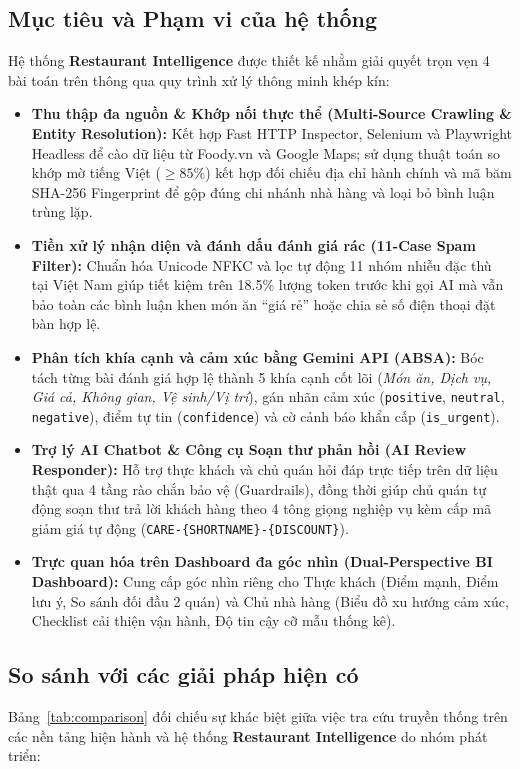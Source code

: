 \documentclass[12pt, a4paper]{article}
\begin{document}
\subsection{Mục tiêu và Phạm vi của hệ thống}
Hệ thống \textbf{Restaurant Intelligence} được thiết kế nhằm giải quyết trọn vẹn 4 bài toán trên thông qua quy trình xử lý thông minh khép kín:
\begin{itemize}[leftmargin=1.2cm]
    \item \textbf{Thu thập đa nguồn \& Khớp nối thực thể (Multi-Source Crawling \& Entity Resolution):} Kết hợp Fast HTTP Inspector, Selenium và Playwright Headless để cào dữ liệu từ Foody.vn và Google Maps; sử dụng thuật toán so khớp mờ tiếng Việt ($\ge 85\%$) kết hợp đối chiếu địa chỉ hành chính và mã băm SHA-256 Fingerprint để gộp đúng chi nhánh nhà hàng và loại bỏ bình luận trùng lặp.
    \item \textbf{Tiền xử lý nhận diện và đánh dấu đánh giá rác (11-Case Spam Filter):} Chuẩn hóa Unicode NFKC và lọc tự động 11 nhóm nhiễu đặc thù tại Việt Nam giúp tiết kiệm trên 18.5\% lượng token trước khi gọi AI mà vẫn bảo toàn các bình luận khen món ăn ``giá rẻ'' hoặc chia sẻ số điện thoại đặt bàn hợp lệ.
    \item \textbf{Phân tích khía cạnh và cảm xúc bằng Gemini API (ABSA):} Bóc tách từng bài đánh giá hợp lệ thành 5 khía cạnh cốt lõi (\textit{Món ăn, Dịch vụ, Giá cả, Không gian, Vệ sinh/Vị trí}), gán nhãn cảm xúc (\texttt{positive}, \texttt{neutral}, \texttt{negative}), điểm tự tin (\texttt{confidence}) và cờ cảnh báo khẩn cấp (\texttt{is\_urgent}).
    \item \textbf{Trợ lý AI Chatbot \& Công cụ Soạn thư phản hồi (AI Review Responder):} Hỗ trợ thực khách và chủ quán hỏi đáp trực tiếp trên dữ liệu thật qua 4 tầng rào chắn bảo vệ (Guardrails), đồng thời giúp chủ quán tự động soạn thư trả lời khách hàng theo 4 tông giọng nghiệp vụ kèm cấp mã giảm giá tự động (\texttt{CARE-\{SHORTNAME\}-\{DISCOUNT\}}).
    \item \textbf{Trực quan hóa trên Dashboard đa góc nhìn (Dual-Perspective BI Dashboard):} Cung cấp góc nhìn riêng cho Thực khách (Điểm mạnh, Điểm lưu ý, So sánh đối đầu 2 quán) và Chủ nhà hàng (Biểu đồ xu hướng cảm xúc, Checklist cải thiện vận hành, Độ tin cậy cỡ mẫu thống kê).
\end{itemize}

\subsection{So sánh với các giải pháp hiện có}
Bảng~\ref{tab:comparison} đối chiếu sự khác biệt giữa việc tra cứu truyền thống trên các nền tảng hiện hành và hệ thống \textbf{Restaurant Intelligence} do nhóm phát triển:
\end{document}
